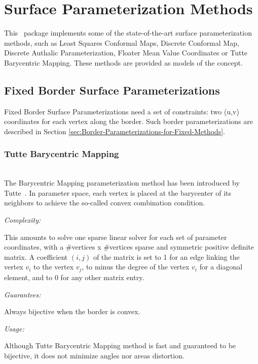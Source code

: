 \section{Surface Parameterization Methods}
\label{sec:Surface-Parameterization-Methods}

This \cgal\ package implements some of the state-of-the-art
surface parameterization methods, such as Least Squares Conformal Maps,
Discrete Conformal Map, Discrete Authalic
Parameterization, Floater Mean Value Coordinates or Tutte Barycentric
Mapping. These methods are provided as models of the
 concept.


\subsection{Fixed Border Surface Parameterizations}

Fixed Border Surface Parameterizations need a set of constraints: two
(u,v) coordinates for each vertex along the border.
Such border parameterizations are described in Section
\ref{sec:Border-Parameterizations-for-Fixed-Methods}.

\subsubsection{Tutte Barycentric Mapping}

  \\

The Barycentric Mapping parameterization method has been introduced by
Tutte~\cite{t-hdg-63}. In parameter space, each vertex is
placed at the barycenter of its neighbors to achieve the so-called
convex combination condition.

\emph{Complexity:}

This amounts to solve one
sparse linear solver for each set of parameter coordinates, with a
\#vertices x \#vertices sparse and symmetric positive definite matrix.
A coefficient $(i, j)$ of the matrix is set to 1 for an edge linking
the vertex $v_i$ to the vertex $v_j$, to minus the degree of the
vertex $v_i$ for a diagonal element, and to 0 for any other matrix
entry.

\emph{Guarantees:}

Always bijective when the border is convex.

\emph{Usage:}

Although Tutte Barycentric Mapping method is fast and
guaranteed to be bijective, it does not minimize angles nor areas
distortion.

